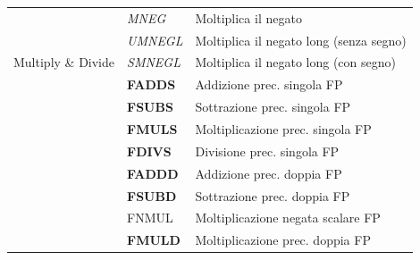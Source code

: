 \documentclass[12pt,a4paper]{article}
\begin{document}
\begin{longtable}{|l|l|l|}
                                                                                      & \textit{MNEG}                                        & Moltiplica il negato                                    \\ \cline{2-3} 
                                                                                      & \textit{UMNEGL}                                      & Moltiplica il negato long (senza segno)                 \\ \cline{2-3} 
\multirow{-10}{*}{Multiply \& Divide}                                                 & \textit{SMNEGL}                                      & Moltiplica il negato long (con segno)                   \\ \hline
                                                                                      & \textbf{FADDS}                                       & Addizione prec. singola FP                              \\ \cline{2-3} 
                                                                                      & \textbf{FSUBS}                                       & Sottrazione prec. singola FP                            \\ \cline{2-3} 
                                                                                      & \textbf{FMULS}                                       & Moltiplicazione prec. singola FP                        \\ \cline{2-3} 
                                                                                      & \textbf{FDIVS}                                       & Divisione prec. singola FP                              \\ \cline{2-3} 
                                                                                      & \textbf{FADDD}                                       & Addizione prec. doppia FP                               \\ \cline{2-3} 
                                                                                      & \textbf{FSUBD}                                       & Sottrazione prec. doppia FP                             \\ \cline{2-3} 
                                                                                      & FNMUL                                                & Moltiplicazione negata scalare FP                       \\ \cline{2-3} 
                                                                                      & \textbf{FMULD}                                       & Moltiplicazione prec. doppia FP                         \\ \cline{2-3} 

\end{longtable}
\end{document}
